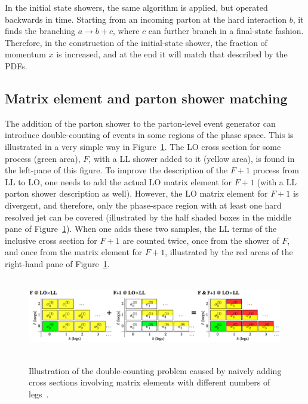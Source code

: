 In the initial state showers, the same algorithm is applied, but operated backwards in time.
Starting from an incoming parton at the hard interaction $b$, it finds the branching $a\rightarrow b+c$, where $c$ can further branch in a final-state fashion.
Therefore, in the construction of the initial-state shower, the fraction of momentum $x$ is increased, and at the end it will match that described by the PDFs.


\subsection{Matrix element and parton shower matching}
    \label{subsec:MEandPSmatching}

The addition of the parton shower to the parton-level event generator can introduce double-counting of events in some regions of the phase space.
This is illustrated in a very simple way in Figure~\ref{fig:MatchingOverlap}.
The LO cross section for some process (green area), $F$, with a LL shower added to it (yellow area), is found in the left-pane of this figure.
To improve the description of the $F+1$ process from LL to LO, one needs to add the actual LO matrix element for $F+1$ (with a LL parton shower description as well).
However, the LO matrix element for $F+1$ is divergent, and therefore, only the phase-space region with at least one hard resolved jet can be covered (illustrated by the half shaded boxes in the middle pane of Figure~\ref{fig:MatchingOverlap}).
When one adds these two samples, the LL terms of the inclusive cross section for $F+1$ are counted twice, once from the shower of $F$, and once from the matrix element for $F+1$, illustrated by the red areas of the right-hand pane of Figure~\ref{fig:MatchingOverlap}.

\begin{figure}[!ht]
  \begin{center}
    \mbox{
        \includegraphics[width=0.995\textwidth]{StandardModel/Figures/MatchingMCOverlap.eps}
    }
  \end{center}
  \caption[Double-counting problem caused by adding cross sections involving matrix elements with different numbers of legs]
{Illustration of the double-counting problem caused by naively adding cross sections involving matrix elements with different numbers of legs~\cite{Skands:2011pf}.}
  \label{fig:MatchingOverlap}
\end{figure}

